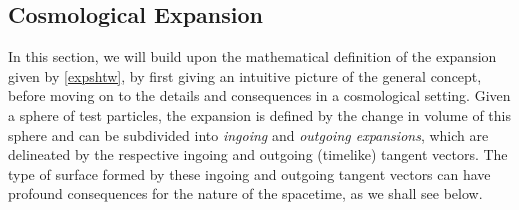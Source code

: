 \subsection{Cosmological Expansion}
\label{sec:cosexp}
In this section, we will build upon the mathematical definition of the expansion given by \eqref{expshtw}, by first giving an intuitive picture of the general concept, before moving on to the details and consequences in a cosmological setting. Given a sphere of test particles, the expansion is defined by the change in volume of this sphere and can be subdivided into \emph{ingoing} and \emph{outgoing expansions}, which are delineated by the respective ingoing and outgoing (timelike) tangent vectors. The type of surface formed by these ingoing and outgoing tangent vectors can have profound consequences for the nature of the spacetime, as we shall see below.

